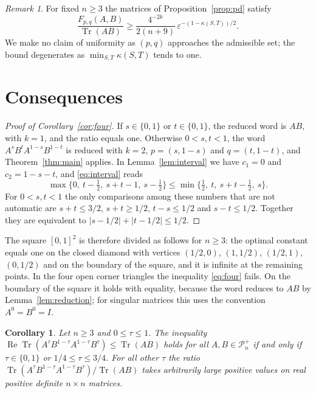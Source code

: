 \documentclass{amsart}
\newtheorem{corollary}[theorem]{Corollary}
\theoremstyle{definition}
\theoremstyle{remark}
\newtheorem{remark}[theorem]{Remark}
\numberwithin{equation}{section}
\newcommand{\Tr}{\operatorname{Tr}}
\newcommand{\PD}{\mathcal{P}_n^{+}}
\newcommand{\cut}{\kappa}
\begin{document}
\begin{remark}\label{rem:rate}
For fixed $n\ge 3$ the matrices of Proposition~\ref{prop:pd} satisfy
\[
\frac{F_{p,q}(A,B)}{\Tr(AB)}\ge\frac{4^{-2k}}{2(n+9)}\,\varepsilon^{-(1-\cut(S,T))/2}.
\] We make no claim of uniformity as $(p,q)$ approaches the admissible set; the bound degenerates as $\min_{S,T}\cut(S,T)$ tends to one.
\end{remark}

\section{Consequences}\label{sec:consequences}

\begin{proof}[Proof of Corollary~\ref{cor:four}]
If $s\in\{0,1\}$ or $t\in\{0,1\}$, the reduced word is $AB$, with $k=1$, and the ratio equals one. Otherwise $0<s,t<1$, the word $A^sB^tA^{1-s}B^{1-t}$ is reduced with $k=2$, $p=(s,1-s)$ and $q=(t,1-t)$, and Theorem~\ref{thm:main} applies. In Lemma~\ref{lem:interval} we have $c_1=0$ and $c_2=1-s-t$, and \eqref{eq:interval} reads
\[
\max\{0,\ t-\tfrac12,\ s+t-1,\ s-\tfrac12\}\le\min\{\tfrac12,\ t,\ s+t-\tfrac12,\ s\}.
\]
For $0<s,t<1$ the only comparisons among these numbers that are not automatic are $s+t\le 3/2$, $s+t\ge 1/2$, $t-s\le 1/2$ and $s-t\le 1/2$. Together they are equivalent to $|s-1/2|+|t-1/2|\le 1/2$.
\end{proof}

The square $[0,1]^2$ is therefore divided as follows for $n\ge 3$: the optimal constant equals one on the closed diamond with vertices $(1/2,0)$, $(1,1/2)$, $(1/2,1)$, $(0,1/2)$ and on the boundary of the square, and it is infinite at the remaining points. In the four open corner triangles the inequality \eqref{eq:four} fails. On the boundary of the square it holds with equality, because the word reduces to $AB$ by Lemma~\ref{lem:reduction}; for singular matrices this uses the convention $A^0=B^0=I$.

\begin{corollary}\label{cor:plevnik}
Let $n\ge 3$ and $0\le\tau\le 1$. The inequality $\operatorname{Re}\Tr(A^{\tau}B^{1-\tau}A^{1-\tau}B^{\tau})\le\Tr(AB)$ holds for all $A,B\in\PD$ if and only if $\tau\in\{0,1\}$ or $1/4\le\tau\le 3/4$. For all other $\tau$ the ratio $\Tr(A^{\tau}B^{1-\tau}A^{1-\tau}B^{\tau})/\Tr(AB)$ takes arbitrarily large positive values on real positive definite $n\times n$ matrices.
\end{corollary}
\end{document}
